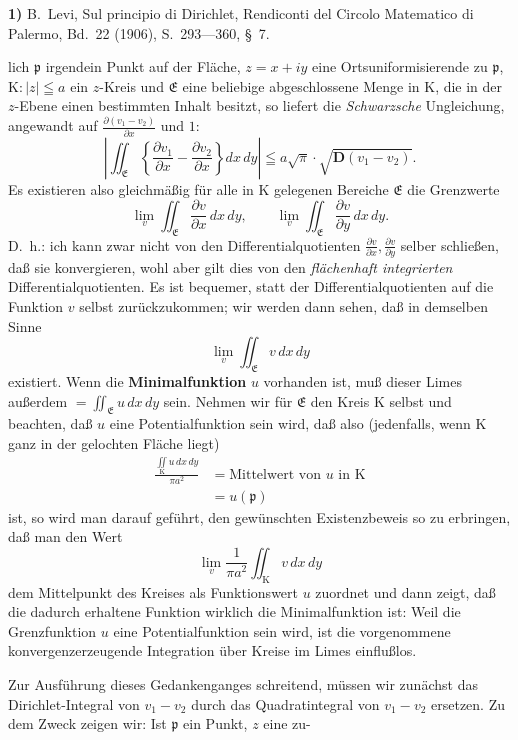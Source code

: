 \documentclass{article}
\begin{document}
\textbf{1)} B.~Levi, Sul principio di Dirichlet, Rendiconti del Circolo Matematico di Palermo, Bd.~22 (1906), S.~293---360, §~7.

lich $\mathfrak{p}$ irgendein Punkt auf der Fläche, $z = x + iy$ eine Ortsuniformisierende zu $\mathfrak{p}$, $\mathrm{K} : |z| \leqq a$ ein $z$-Kreis und $\mathfrak{E}$ eine beliebige abgeschlossene Menge in $\mathrm{K}$, die in der $z$-Ebene einen bestimmten Inhalt besitzt, so liefert die \emph{Schwarzsche} Ungleichung, angewandt auf $\frac{\partial(v_1 - v_2)}{\partial x}$ und $1$:
\[ \left| \iint_{\mathfrak{E}} \left\{ \frac{\partial v_1}{\partial x} - \frac{\partial v_2}{\partial x} \right\} dx\,dy \right| \leqq a\sqrt{\pi} \cdot \sqrt{\mathbf{D}(v_1 - v_2)}. \]
Es existieren also gleichmäßig für alle in $\mathrm{K}$ gelegenen Bereiche $\mathfrak{E}$ die Grenzwerte
\[ \lim_v \iint_{\mathfrak{E}} \frac{\partial v}{\partial x}\,dx\,dy, \qquad \lim_v \iint_{\mathfrak{E}} \frac{\partial v}{\partial y}\,dx\,dy. \]
D.~h.: ich kann zwar nicht von den Differentialquotienten $\frac{\partial v}{\partial x}, \frac{\partial v}{\partial y}$ selber schließen, daß sie konvergieren, wohl aber gilt dies von den \emph{flächenhaft integrierten} Differentialquotienten. Es ist bequemer, statt der Differentialquotienten auf die Funktion $v$ selbst zurückzukommen; wir werden dann sehen, daß in demselben Sinne
\[ \lim_v \iint_{\mathfrak{E}} v\,dx\,dy \]
existiert. Wenn die \textbf{Minimalfunktion} $u$ vorhanden ist, muß dieser Limes außerdem $=\iint_{\mathfrak{E}} u\,dx\,dy$ sein. Nehmen wir für $\mathfrak{E}$ den Kreis $\mathrm{K}$ selbst und beachten, daß $u$ eine Potentialfunktion sein wird, daß also (jedenfalls, wenn $\mathrm{K}$ ganz in der gelochten Fläche liegt)
\[ \begin{aligned}
\frac{\iint\limits_{\mathrm{K}} u\,dx\,dy}{\pi a^2} &= \text{Mittelwert von } u \text{ in } \mathrm{K} \\
&= u(\mathfrak{p})
\end{aligned} \]
ist, so wird man darauf geführt, den gewünschten Existenzbeweis so zu erbringen, daß man den Wert
\[ \lim_v \frac{1}{\pi a^2} \iint_{\mathrm{K}} v\,dx\,dy \]
dem Mittelpunkt des Kreises als Funktionswert $u$ zuordnet und dann zeigt, daß die dadurch erhaltene Funktion wirklich die Minimalfunktion ist: Weil die Grenzfunktion $u$ eine Potentialfunktion sein wird, ist die vorgenommene konvergenzerzeugende Integration über Kreise im Limes einflußlos.

Zur Ausführung dieses Gedankenganges schreitend, müssen wir zunächst das Dirichlet-Integral von $v_1 - v_2$ durch das Quadratintegral von $v_1 - v_2$ ersetzen. Zu dem Zweck zeigen wir: Ist $\mathfrak{p}$ ein Punkt, $z$ eine zu-
\end{document}
